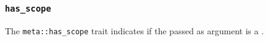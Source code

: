 
\subsubsection{\texttt{has\_scope}}

The \texttt{meta::has\_scope}
trait indicates if the  passed as argument is a .


